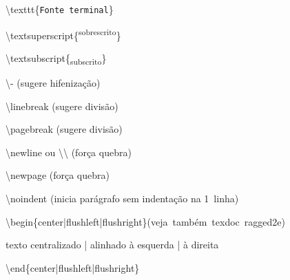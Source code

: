 \documentclass[10pt,twoside,english,brazilian]{article}
\begin{document}
\begin{multicols}{3}
\textbackslash{}texttt\{\texttt{Fonte terminal}\}

\textbackslash{}textsuperscript\{\textsuperscript{sobrescrito}\}

\textbackslash{}textsubscript\{\textsubscript{subscrito}\}

\textbackslash{}- (sugere hifenização)

\textbackslash{}linebreak (sugere divisão)

\textbackslash{}pagebreak (sugere divisão)

\textbackslash{}newline ou \textbackslash\textbackslash{} (força quebra)

\textbackslash{}newpage (força quebra)

\textbackslash{}noindent (inicia parágrafo sem indentação na
                         1\textordfeminine\ linha)

\textbackslash{}begin\{center|flushleft|flushright\}\quad \mbox{(veja também
                                                    \textsf{texdoc ragged2e})}

\quad texto centralizado | alinhado à esquerda | à direita

\textbackslash{}end\{center|flushleft|flushright\}

\end{multicols}
\end{document}
